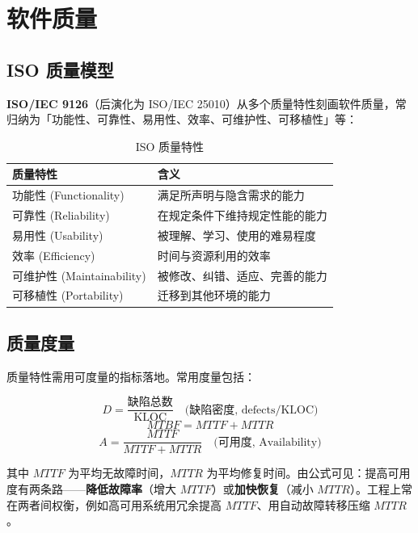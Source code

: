 \section{软件质量}

\subsection{ISO 质量模型}

\textbf{ISO/IEC 9126}（后演化为 ISO/IEC 25010）从多个质量特性刻画软件质量，常归纳为「功能性、可靠性、易用性、效率、可维护性、可移植性」等：

\begin{table}[H]
\centering
\caption{ISO 质量特性}
\begin{tabulary}{\textwidth}{LL}
\toprule
质量特性 & 含义 \\
\midrule
功能性 (Functionality) & 满足所声明与隐含需求的能力 \\
可靠性 (Reliability) & 在规定条件下维持规定性能的能力 \\
易用性 (Usability) & 被理解、学习、使用的难易程度 \\
效率 (Efficiency) & 时间与资源利用的效率 \\
可维护性 (Maintainability) & 被修改、纠错、适应、完善的能力 \\
可移植性 (Portability) & 迁移到其他环境的能力 \\
\bottomrule
\end{tabulary}
\end{table}

\subsection{质量度量}

质量特性需用可度量的指标落地。常用度量包括：

\begin{equation}
    D = \frac{\text{缺陷总数}}{\text{KLOC}} \quad \text{(缺陷密度, defects/KLOC)}
\end{equation}
\begin{equation}
    MTBF = MTTF + MTTR
\end{equation}
\begin{equation}
    A = \frac{MTTF}{MTTF + MTTR} \quad \text{(可用度, Availability)}
\end{equation}

其中 $MTTF$ 为平均无故障时间，$MTTR$ 为平均修复时间。由公式可见：提高可用度有两条路——\textbf{降低故障率}（增大 $MTTF$）或\textbf{加快恢复}（减小 $MTTR$）。工程上常在两者间权衡，例如高可用系统用冗余提高 $MTTF$、用自动故障转移压缩 $MTTR$。

